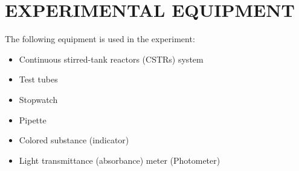 \section{EXPERIMENTAL EQUIPMENT}
The following equipment is used in the experiment:
\begin{itemize}
    \item Continuous stirred-tank reactors (CSTRs) system
    \item Test tubes
    \item Stopwatch
    \item Pipette
    \item Colored substance (indicator)
    \item Light transmittance (absorbance) meter (Photometer)
\end{itemize}
